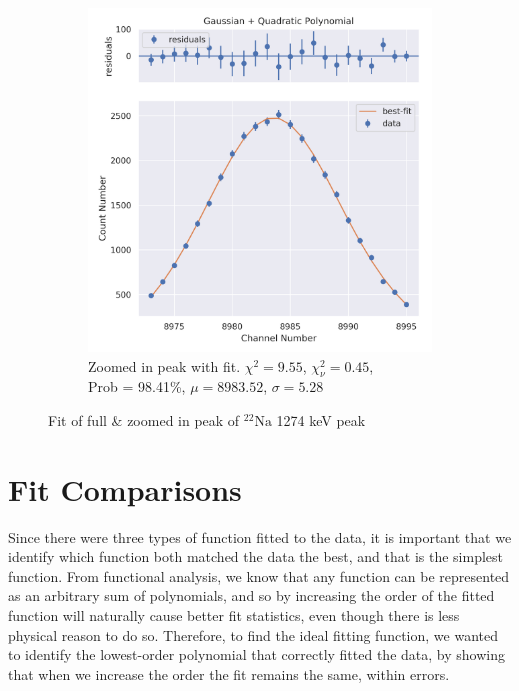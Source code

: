 \documentclass[11pt,a4paper]{article}
\newcommand{\element}[2]{$^{#2}\textrm{#1}$}
\begin{document}
\begin{figure}[H]
\begin{subfigure}{.5\linewidth}
    \includegraphics[width=\linewidth]{./Images/Sodium22/Quad/Quad_2_Zoom.png}
    \caption{Zoomed in peak with fit. $\chi^2 = 9.55$, $\chi^2_\nu = 0.45$, \\ Prob = 98.41\%, $\mu = 8983.52$, $\sigma = 5.28$}
  \end{subfigure}
  \caption{Fit of full \& zoomed in peak of \element{Na}{22} 1274 keV peak}
\end{figure}

\clearpage

\section{Fit Comparisons}

Since there were three types of function fitted to the data, it is important that we identify which function both matched the data the best, and that is the simplest function. From functional analysis, we know that any function can be represented as an arbitrary sum of polynomials, and so by increasing the order of the fitted function will naturally cause better fit statistics, even though there is less physical reason to do so. Therefore, to find the ideal fitting function, we wanted to identify the lowest-order polynomial that correctly fitted the data, by showing that when we increase the order the fit remains the same, within errors.
\end{document}

